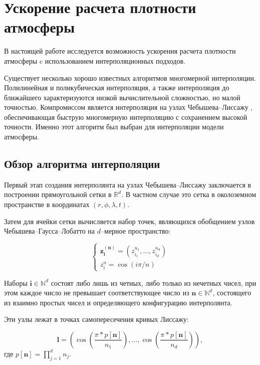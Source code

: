 \section{Ускорение расчета плотности атмосферы}
\label{sec:Chapter2} 

В настоящей работе исследуется возможность ускорения расчета плотности атмосферы c
использованием интерполяционных подходов.

Существует несколько хорошо известных алгоритмов многомерной интерполяции. Полилинейная и
поликубическая интерполяция, а также интерполяция до ближайшего характеризуются низкой
вычислительной сложностью, но малой точностью. 
Компромиссом является интерполяция на узлах Чебышева--Лиссажу \cite{dencker2017}, обеспечивающая
быструю многомерную интерполяцию с сохранением высокой точности. 
Именно этот алгоритм был выбран для интерполяции модели атмосферы.

\subsection{Обзор алгоритма интерполяции}
Первый этап создания интерполянта на узлах Чебышева--Лиссажу заключается в построении 
прямоугольной сетки в $\mathbb{R}^d$. В частном случае это сетка в
околоземном пространстве в координатах $(r, \phi, \lambda, t)$.

Затем для ячейки сетки вычисляется набор точек, являющихся обобщением
узлов Чебышева--Гаусса--Лобатто на $d$--мерное пространство:

\begin{equation*}
    \begin{cases*}
        \mathbf{z_{\mathbf{i}}^{\mathbf{(\mathbf{n})}}} = (z_{i_1}^{n_1}, \dots, z_{i_d}^{n_d}) \\
        z_i^{n} = \cos (i \pi / n)
    \end{cases*}
\end{equation*}

Наборы $\mathbf{i} \in \mathbb{N}^d$ состоят либо лишь из четных, либо только из нечетных чисел, при этом каждое
число не превышает соответствующее число из $\mathbf{n} \in \mathbb{N}^d$, 
состоящего из взаимно простых чисел и определяющего конфигурацию интерполянта.

Эти узлы лежат в точках самопересечения кривых Лиссажу:

\begin{equation*}
    \mathbf{l} = \left(\cos \left( \frac{\pi * p[\mathbf{n}]}{n_1} \right), 
                \dots,\cos \left( \frac{\pi * p[\mathbf{n}]}{n_d} \right) \right),
\end{equation*}
где $p[\mathbf{n}] = \prod_{j=1}^{d} n_j$.

